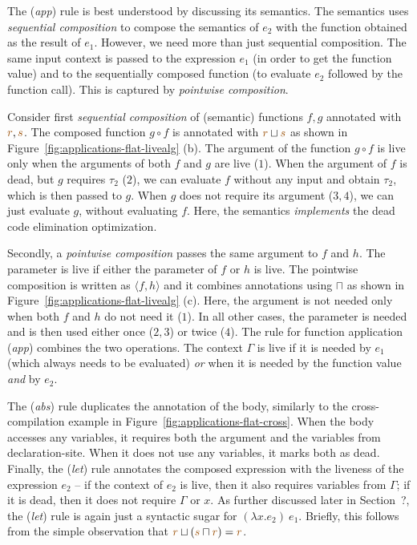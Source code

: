 The (\emph{app}) rule is best understood by discussing its semantics. The semantics uses 
\emph{sequential composition} to compose the semantics of $e_2$ with the function obtained
as the result of $e_1$. However, we need more than just sequential composition. The same input
context is passed to the expression $e_1$ (in order to get the function value) and to the
sequentially composed function (to evaluate $e_2$ followed by the function call). This is captured 
by \emph{pointwise composition}.


Consider first \emph{sequential composition} of (semantic) functions $f, g$ annotated with 
$\aclrd{r}, \aclrd{s}$. The composed function $g \circ f$ is annotated with $\aclrd{r} \sqcup \aclrd{s}$
as shown in Figure~\ref{fig:applications-flat-livealg} (b).
The argument of the function $g \circ f$ is live only when the arguments of both $f$ and $g$ are 
live ($1$). When the argument of $f$ is dead, but $g$ requires $\tau_2$ ($2$), we can evaluate 
$f$ without any input and obtain $\tau_2$, which is then passed to $g$. When $g$ does not require
its argument ($3, 4$), we can just evaluate $g$, without evaluating $f$. Here, the semantics
\emph{implements} the dead code elimination optimization.

Secondly, a \emph{pointwise composition} passes the same argument to $f$ and $h$. The parameter 
is live if either the parameter of $f$ or $h$ is live. The pointwise composition is written as
$\langle f, h \rangle$ and it combines annotations using $\sqcap$ as shown in Figure~\ref{fig:applications-flat-livealg} (c).
Here, the argument is not needed only when both $f$ and $h$ do not need it ($1$). In all other cases,
the parameter is needed and is then used either once ($2,3$) or twice ($4$). The rule for function
application (\emph{app}) combines the two operations. The context $\Gamma$ is live if it is needed by
$e_1$ (which always needs to be evaluated) \emph{or} when it is needed by the function value \emph{and}
by $e_2$. 

The (\emph{abs}) rule duplicates the annotation of the body, similarly to the cross-compilation 
example in Figure~\ref{fig:applications-flat-cross}. When the body accesses any variables, it 
requires both the argument and the variables from declaration-site. When it does not use any variables,
it marks both as dead. Finally, the (\emph{let}) rule annotates the composed expression with the
liveness of the expression $e_2$ -- if the context of $e_2$ is live, then it also requires variables
from $\Gamma$; if it is dead, then it does not require $\Gamma$ or $x$. 
As further discussed later in Section~?, the (\emph{let}) rule is again just a syntactic sugar for 
$(\lambda x.e_2)~e_1$. Briefly, this follows from the simple observation that 
$\aclrd{r} \sqcup (\aclrd{s} \sqcap \aclrd{r}) = \aclrd{r}$.

